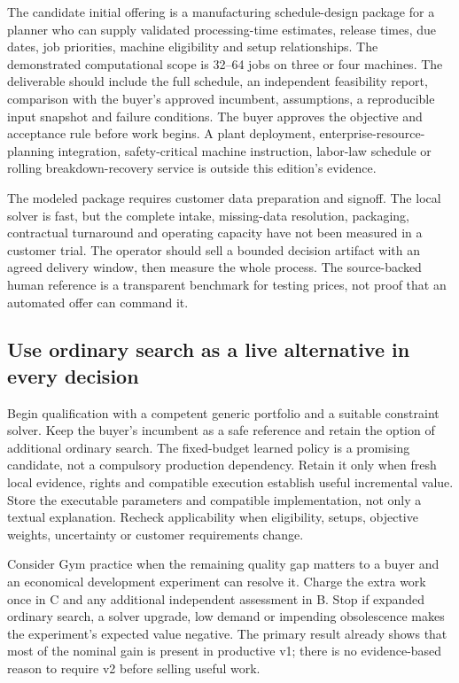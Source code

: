 \documentclass[11pt,letterpaper]{article}
\begin{document}
The candidate initial offering is a manufacturing schedule-design package for a planner who can supply validated processing-time estimates, release times, due dates, job priorities, machine eligibility and setup relationships. The demonstrated computational scope is 32--64 jobs on three or four machines. The deliverable should include the full schedule, an independent feasibility report, comparison with the buyer's approved incumbent, assumptions, a reproducible input snapshot and failure conditions. The buyer approves the objective and acceptance rule before work begins. A plant deployment, enterprise-resource-planning integration, safety-critical machine instruction, labor-law schedule or rolling breakdown-recovery service is outside this edition's evidence.

The modeled package requires customer data preparation and signoff. The local solver is fast, but the complete intake, missing-data resolution, packaging, contractual turnaround and operating capacity have not been measured in a customer trial. The operator should sell a bounded decision artifact with an agreed delivery window, then measure the whole process. The source-backed human reference is a transparent benchmark for testing prices, not proof that an automated offer can command it.

\subsection{Use ordinary search as a live alternative in every decision}

Begin qualification with a competent generic portfolio and a suitable constraint solver. Keep the buyer's incumbent as a safe reference and retain the option of additional ordinary search. The fixed-budget learned policy is a promising candidate, not a compulsory production dependency. Retain it only when fresh local evidence, rights and compatible execution establish useful incremental value. Store the executable parameters and compatible implementation, not only a textual explanation. Recheck applicability when eligibility, setups, objective weights, uncertainty or customer requirements change.

Consider Gym practice when the remaining quality gap matters to a buyer and an economical development experiment can resolve it. Charge the extra work once in C and any additional independent assessment in B. Stop if expanded ordinary search, a solver upgrade, low demand or impending obsolescence makes the experiment's expected value negative. The primary result already shows that most of the nominal gain is present in productive v1; there is no evidence-based reason to require v2 before selling useful work.
\end{document}
